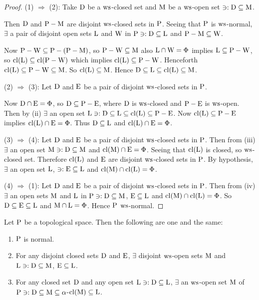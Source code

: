 \begin{proof}
(1) $\Rightarrow$ (2): Take $\mathrm{D}$ be a $\mathrm{ws}$-closed set and $\mathrm{M}$ be a $\mathrm{ws}$-open set $\ni: \mathrm{D} \subseteq \mathrm{M}$. 

Then $\mathrm{D}$ and $\mathrm{P} -\mathrm{M}$ are disjoint $\mathrm{ws}$-closed sets in $\mathrm{P}$. Seeing that $\mathrm{P}$ is $\mathrm{ws}$-normal, $\exists$ a pair of disjoint open sets $\mathrm{L}$ and $\mathrm{W}$ in $\mathrm{P} \ni: \mathrm{D} \subseteq \mathrm{L}$ and $\mathrm{P} -\mathrm{M} \subseteq \mathrm{W}$.

Now $\mathrm{P} -\mathrm{W} \subseteq \mathrm{P} - (\mathrm{P} -\mathrm{M})$, so $\mathrm{P} -\mathrm{W} \subseteq \mathrm{M}$ also $\mathrm{L} \cap\mathrm{W} = \Phi$ implies $\mathrm{L} \subseteq \mathrm{P} -\mathrm{W}$, so $\mathrm{cl}(\mathrm{L}) \subseteq \mathrm{cl}(\mathrm{P} -\mathrm{W})$ which implies $\mathrm{cl}(\mathrm{L}) \subseteq \mathrm{P} - \mathrm{W}$. Henceforth $\mathrm{cl}(\mathrm{L}) \subseteq \mathrm{P} -\mathrm{W} \subseteq \mathrm{M}$. So $\mathrm{cl} (\mathrm{L}) \subseteq \mathrm{M}$. Hence $\mathrm{D} \subseteq \mathrm{L} \subseteq \mathrm{cl}(\mathrm{L}) \subseteq \mathrm{M}$.

(2) $\Rightarrow$ (3): Let $\mathrm{D}$ and $\mathrm{E}$ be a pair of disjoint $\mathrm{ws}$-closed sets in $\mathrm{P}$.

Now $\mathrm{D}\cap\mathrm{E} = \Phi$, so $\mathrm{D}\subseteq \mathrm{P} -\mathrm{E}$, where $\mathrm{D}$ is $\mathrm{ws}$-closed and $\mathrm{P} - \mathrm{E}$ is $\mathrm{ws}$-open. Then by (ii) $\exists$ an open set $\mathrm{L} \ni: \mathrm{D} \subseteq \mathrm{L} \subseteq \mathrm{cl}(\mathrm{L}) \subseteq \mathrm{P} - \mathrm{E}$. Now $\mathrm{cl} (\mathrm{L}) \subseteq \mathrm{P} -\mathrm{E}$ implies $\mathrm{cl}(\mathrm{L}) \cap \mathrm{E} =\Phi$. Thus $\mathrm{D} \subseteq \mathrm{L}$ and $\mathrm{cl}(\mathrm{L}) \cap \mathrm{E} = \Phi$.

(3) $\Rightarrow$ (4): Let $\mathrm{D}$ and $\mathrm{E}$ be a pair of disjoint $\mathrm{ws}$-closed sets in $\mathrm{P}$. Then from (iii) $\exists$ an open set $\mathrm{M} \ni: \mathrm{D} \subseteq \mathrm{M}$ and $\mathrm{cl} (\mathrm{M}) \cap\mathrm{E} = \Phi$. Seeing that $\mathrm{cl} (\mathrm{L})$ is closed, so $\mathrm{ws}$-closed set. Therefore $\mathrm{cl}(\mathrm{L})$ and $\mathrm{E}$ are disjoint $\mathrm{ws}$-closed sets in $\mathrm{P}$. By hypothesis, $\exists$ an open set $\mathrm{L}$, $\ni: \mathrm{E} \subseteq \mathrm{L}$ and $\mathrm{cl} (\mathrm{M})\cap \mathrm{cl} (\mathrm{L}) = \Phi$.

(4) $\Rightarrow$ (1): Let $\mathrm{D}$ and $\mathrm{E}$ be a pair of disjoint $\mathrm{ws}$-closed sets in $\mathrm{P}$. Then from (iv) $\exists$ an open sets $\mathrm{M}$ and $\mathrm{L}$ in $\mathrm{P} \ni: \mathrm{D} \subseteq \mathrm{M}$, $\mathrm{E} \subseteq \mathrm{L}$ and $\mathrm{cl} (\mathrm{M}) \cap\mathrm{cl} (\mathrm{L}) = \Phi$. So $\mathrm{D} \subseteq \mathrm{E} \subseteq \mathrm{L}$ and $\mathrm{M} \cap \mathrm{L} = \Phi$. Hence $\mathrm{P}$ $\mathrm{ws}$-normal.
\end{proof}

\begin{thm}\label{thm8.4.10}
Let $\mathrm{P}$ be a topological space. Then the following are one and the same:
\begin{enumerate}[(1)]
\item $\mathrm{P}$ is normal.
\item For any disjoint closed sets $\mathrm{D}$ and $\mathrm{E}$, $\exists$ disjoint $\mathrm{ws}$-open sets $\mathrm{M}$ and $\mathrm{L} \ni: \mathrm{D} \subseteq \mathrm{M}$, $\mathrm{E} \subseteq \mathrm{L}$.
\item For any closed set $\mathrm{D}$ and any open set $\mathrm{L} \ni: \mathrm{D} \subseteq \mathrm{L}$, $\exists$ an $\mathrm{ws}$-open set $\mathrm{M}$ of $\mathrm{P} \ni: \mathrm{D} \subseteq \mathrm{M} \subseteq \alpha$-$\mathrm{cl}(\mathrm{M}) \subseteq \mathrm{L}$.
\end{enumerate}
\end{thm}

